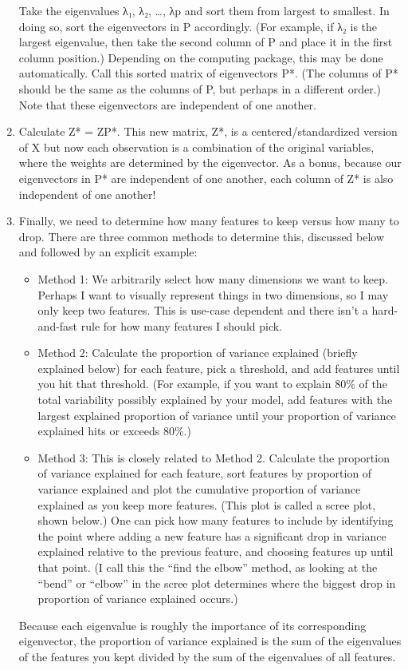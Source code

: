 \documentclass[
]{book}
\begin{document}
\begin{enumerate}
  Take the eigenvalues λ₁, λ₂, \ldots, λp and sort them from largest to smallest. In doing so, sort the eigenvectors in P accordingly. (For example, if λ₂ is the largest eigenvalue, then take the second column of P and place it in the first column position.) Depending on the computing package, this may be done automatically. Call this sorted matrix of eigenvectors P*. (The columns of P* should be the same as the columns of P, but perhaps in a different order.) Note that these eigenvectors are independent of one another.
\item
  Calculate Z* = ZP*. This new matrix, Z*, is a centered/standardized version of X but now each observation is a combination of the original variables, where the weights are determined by the eigenvector. As a bonus, because our eigenvectors in P* are independent of one another, each column of Z* is also independent of one another!
\item
  Finally, we need to determine how many features to keep versus how many to drop. There are three common methods to determine this, discussed below and followed by an explicit example:

  \begin{itemize}
  \item
    Method 1: We arbitrarily select how many dimensions we want to keep. Perhaps I want to visually represent things in two dimensions, so I may only keep two features. This is use-case dependent and there isn't a hard-and-fast rule for how many features I should pick.
  \item
    Method 2: Calculate the proportion of variance explained (briefly explained below) for each feature, pick a threshold, and add features until you hit that threshold. (For example, if you want to explain 80\% of the total variability possibly explained by your model, add features with the largest explained proportion of variance until your proportion of variance explained hits or exceeds 80\%.)
  \item
    Method 3: This is closely related to Method 2. Calculate the proportion of variance explained for each feature, sort features by proportion of variance explained and plot the cumulative proportion of variance explained as you keep more features. (This plot is called a scree plot, shown below.) One can pick how many features to include by identifying the point where adding a new feature has a significant drop in variance explained relative to the previous feature, and choosing features up until that point. (I call this the ``find the elbow'' method, as looking at the ``bend'' or ``elbow'' in the scree plot determines where the biggest drop in proportion of variance explained occurs.)
  \end{itemize}

  Because each eigenvalue is roughly the importance of its corresponding eigenvector, the proportion of variance explained is the sum of the eigenvalues of the features you kept divided by the sum of the eigenvalues of all features.
\end{enumerate}
\end{document}
